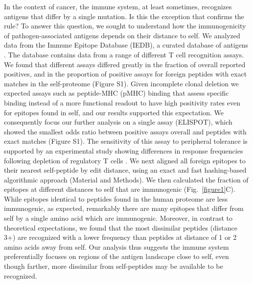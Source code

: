 \documentclass[superscriptaddress,twocolumn,pre]{revtex4}
\newcommand{\<}{\langle}
\renewcommand{\>}{\rangle}
\begin{document}
In the context of cancer, the immune system, at least sometimes, recognizes antigens that differ by a single mutation. Is this the exception that confirms the rule? To answer this question, we sought to understand how the immunogenicity of pathogen-associated antigens depends on their distance to self. We analyzed data from the Immune Epitope Database (IEDB), a curated database of antigens \cite{Vita2019}. The database contains data from a range of different T cell recognition assays. We found that different assays differed greatly in the fraction of overall reported positives, and in the proportion of positive assays for foreign peptides with exact matches in the self-proteome (Figure S1). Given incomplete clonal deletion we expected assays such as peptide-MHC (pMHC) binding that assess specific binding instead of a more functional readout to have high positivity rates even for epitopes found in self, and our results supported this expectation. We consequently focus our further analysis on a single assay (ELISPOT), which showed the smallest odds ratio between positive assays overall and peptides with exact matches (Figure S1). The sensitivity of this assay to peripheral tolerance is supported by an experimental study showing differences in response frequencies following depletion of regulatory T cells \cite{Bonertz2009}. We next aligned all foreign epitopes to their nearest self-peptide by edit distance, using an exact and fast hashing-based algorithmic approach (Material and Methods). We then calculated the fraction of epitopes at different distances to self that are immunogenic (Fig.~\ref{figure1}C). While epitopes identical to peptides found in the human proteome are less immunogenic, as expected, remarkably there are many epitopes that differ from self by a single amino acid which are immunogenic. Moreover, in contrast to theoretical expectations, we found that the most dissimilar peptides (distance 3+) are recognized with a lower frequency than peptides at distance of 1 or 2 amino acids away from self. Our analysis thus suggests the immune system preferentially focuses on regions of the antigen landscape close to self, even though farther, more dissimilar from self-peptides may be available to be recognized.
\end{document}

